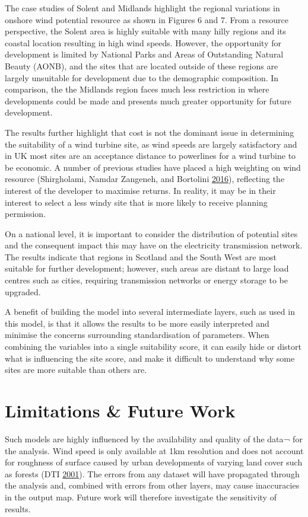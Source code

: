 \documentclass[a4paper,]{article}
\theoremstyle{definition}
\theoremstyle{definition}
\theoremstyle{remark}
\begin{document}
{The case studies of Solent and Midlands highlight the regional
variations in onshore wind potential resource as shown in Figures 6 and
7. From a resource perspective, the Solent area is highly suitable with
many hilly regions and its coastal location resulting in high wind
speeds. However, the opportunity for development is limited by National
Parks and Areas of Outstanding Natural Beauty (AONB), and the sites that
are located outside of these regions are largely unsuitable for
development due to the demographic composition. In comparison, the the
Midlands region faces much less restriction in where developments could
be made and presents much greater opportunity for future development.

The results further highlight that cost is not the dominant issue in
determining the suitability of a wind turbine site, as wind speeds are
largely satisfactory and in UK most sites are an acceptance distance to
powerlines for a wind turbine to be economic. A number of previous
studies have placed a high weighting on wind resource (Shirgholami,
Namdar Zangeneh, and Bortolini
\protect\hyperlink{ref-Shirgholami2016}{2016}), reflecting the interest
of the developer to maximise returns. In reality, it may be in their
interest to select a less windy site that is more likely to receive
planning permission.

On a national level, it is important to consider the distribution of
potential sites and the consequent impact this may have on the
electricity transmission network. The results indicate that regions in
Scotland and the South West are most suitable for further development;
however, such areas are distant to large load centres such as cities,
requiring transmission networks or energy storage to be upgraded.

A benefit of building the model into several intermediate layers, such
as used in this model, is that it allows the results to be more easily
interpreted and minimise the concerns surrounding standardisation of
parameters. When combining the variables into a single suitability
score, it can easily hide or distort what is influencing the site score,
and make it difficult to understand why some sites are more suitable
than others are.

\section{Limitations \& Future Work}\label{limitations-future-work}

Such models are highly influenced by the availability and quality of the
data¬ for the analysis. Wind speed is only available at 1km resolution
and does not account for roughness of surface caused by urban
developments of varying land cover such as forests (DTI
\protect\hyperlink{ref-DTI2001}{2001}). The errors from any dataset will
have propagated through the analysis and, combined with errors from
other layers, may cause inaccuracies in the output map. Future work will
therefore investigate the sensitivity of results.

}
\end{document}
